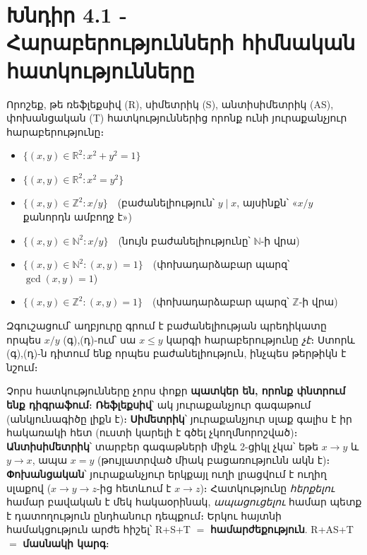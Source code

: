\documentclass[11pt,a4paper]{article}
\newcommand{\Z}{\mathbb{Z}}
\newcommand{\R}{\mathbb{R}}
\newcommand{\N}{\mathbb{N}}
\begin{document}
\section*{Խնդիր 4.1 - Հարաբերությունների հիմնական հատկությունները}

\begin{problembox}[4.1]
Որոշեք, թե ռեֆլեքսիվ (R), սիմետրիկ (S), անտիսիմետրիկ (AS), փոխանցական (T) հատկություններից որոնք ունի
յուրաքանչյուր հարաբերությունը։
\begin{itemize}[leftmargin=1.6em,nosep]
\item[ա)] $\{(x,y)\in\R^2 : x^2+y^2=1\}$
\item[բ)] $\{(x,y)\in\R^2 : x^2=y^2\}$
\item[գ)] $\{(x,y)\in\Z^2 : x/y\}$\ \ (բաժանելիություն՝ $y\mid x$, այսինքն՝ «$x/y$ քանորդն ամբողջ է»)
\item[դ)] $\{(x,y)\in\N^2 : x/y\}$\ \ (նույն բաժանելիությունը՝ $\N$-ի վրա)
\item[ե)] $\{(x,y)\in\N^2 : (x,y)=1\}$\ \ (փոխադարձաբար պարզ՝ $\gcd(x,y)=1$)
\item[զ)] $\{(x,y)\in\Z^2 : (x,y)=1\}$\ \ (փոխադարձաբար պարզ՝ $\Z$-ի վրա)
\end{itemize}
\footnotesize Զգուշացում՝ աղբյուրը գրում է բաժանելիության պրեդիկատը որպես $x/y$ (գ),(դ)-ում՝ սա
$x\le y$ կարգի հարաբերությունը \emph{չէ}։ Ստորև (գ),(դ)-ն դիտում ենք որպես բաժանելիություն,
ինչպես թերթիկն է նշում։
\end{problembox}

\begin{ideabox}
Չորս հատկությունները չորս փոքր \textbf{պատկեր են, որոնք փնտրում ենք դիգրաֆում}։
\textbf{Ռեֆլեքսիվ}՝ ակ յուրաքանչյուր գագաթում (անկյունագիծը լիքն է)։
\textbf{Սիմետրիկ}՝ յուրաքանչյուր սլաք գալիս է իր հակառակի հետ (ուստի կարելի է գծել չկողմնորոշված)։
\textbf{Անտիսիմետրիկ}՝ տարբեր գագաթների միջև 2-ցիկլ չկա՝ եթե $x\to y$ և $y\to x$, ապա $x=y$
(թույլատրված միակ բացառությունն ակն է)։
\textbf{Փոխանցական}՝ յուրաքանչյուր երկքայլ ուղի լրացվում է ուղիղ սլաքով ($x\to y\to z$-ից
հետևում է $x\to z$)։ Հատկությունը \emph{հերքելու} համար բավական է մեկ հակաօրինակ, \emph{ապացուցելու}
համար պետք է դատողություն ընդհանուր դեպքում։ Երկու հայտնի համակցություն արժե հիշել՝ R+S+T $=$
\textbf{համարժեքություն}. R+AS+T $=$ \textbf{մասնակի կարգ}։
\end{ideabox}
\end{document}
